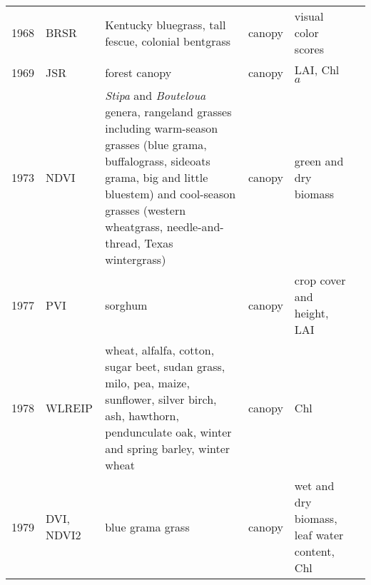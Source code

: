 \documentclass[10pt]{article}
\begin{document}
{\begin{ThreePartTable}
\begin{longtable}{c M{1.5in} M{2.5in} c M{1.5in} M{1.5in}}
  1968 & BRSR                                            & Kentucky bluegrass, tall fescue, colonial bentgrass                                                                                                                                                                                                   & canopy       & visual color scores                                                                      & \citet{Birth1968}                                   \\
  1969 & JSR                                             & forest canopy                                                                                                                                                                                                                                         & canopy       & LAI, Chl $a$                                                                             & \citet{Jordan1969}                                  \\
  1973 & NDVI                                            & \textit{Stipa} and \textit{Bouteloua} genera, rangeland grasses including warm-season grasses (blue grama, buffalograss, sideoats grama, big and little bluestem) and cool-season grasses (western wheatgrass, needle-and-thread, Texas wintergrass)  & canopy       & green and dry biomass                                                                    & \citet{Rouse1973}                                   \\
  1977 & PVI                                             & sorghum                                                                                                                                                                                                                                               & canopy       & crop cover and height, LAI                                                               & \citet{Richardson1977}                              \\
  1978 & WLREIP                                          & wheat, alfalfa, cotton, sugar beet, sudan grass, milo, pea, maize, sunflower, silver birch, ash, hawthorn, pendunculate oak, winter and spring barley, winter wheat                                                                                   & canopy       & Chl                                                                                      & \citet{Collins1978,Horler1983}                      \\
  1979 & DVI, NDVI2                                      & blue grama grass                                                                                                                                                                                                                                      & canopy       & wet and dry biomass, leaf water content, Chl                                             & \citet{Tucker1979}                                  \\

\end{longtable}
\end{ThreePartTable}}
\end{document}
